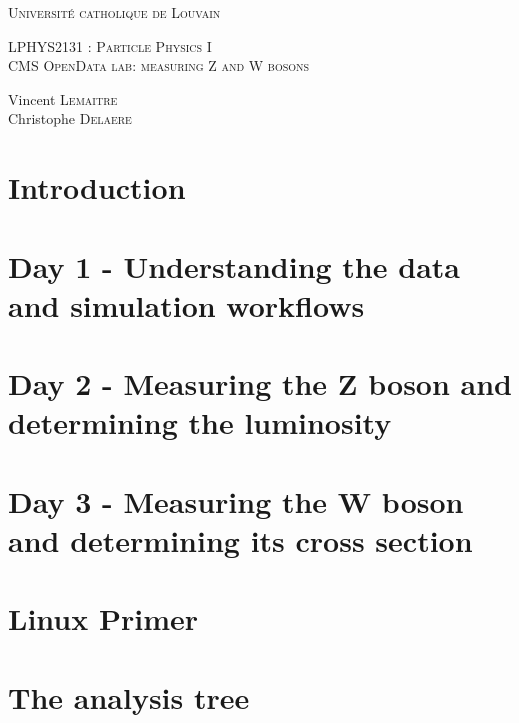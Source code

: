 \documentclass[a4paper]{scrartcl}
\begin{document}
\def\w{\par \vspace{\baselineskip}}
\begin{titlepage}
\begin{center}
\textsc{\Large Université catholique de Louvain }\\[0.5cm]
\w
\w
\textsc{\huge LPHYS2131 : Particle Physics I }\\[0.34cm]
\textsc{\large CMS OpenData lab: measuring Z and W bosons}\\[0.7cm]
\w
\begin{minipage}{0.6\textwidth}
\begin{center}
\large
Vincent \textsc{Lemaitre}\\
Christophe \textsc{Delaere}\\
\end{center}
\end{minipage} 
\end{center}
\end{titlepage}

\tableofcontents
\newpage

\section{Introduction}

\newpage

\section{Day 1 - Understanding the data and simulation workflows}

\newpage

\section{Day 2 - Measuring the Z boson and determining the luminosity}

\newpage

\section{Day 3 - Measuring the W boson and determining its cross section}

\newpage

\section{Linux Primer}

\newpage

%

%

\section{The analysis tree}

\newpage
\end{document}

